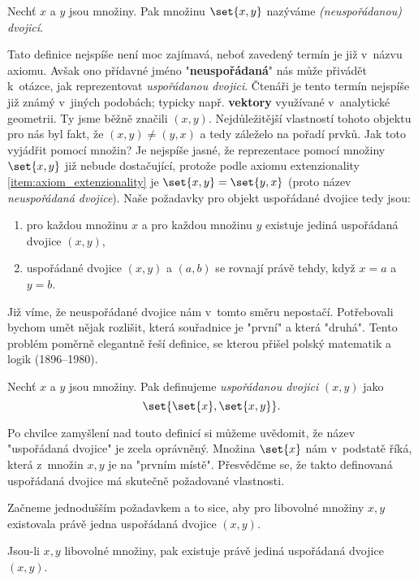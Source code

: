 \begin{definition}
    Nechť $x$ a $y$ jsou množiny. Pak množinu $\set{x,y}$ nazýváme \emph{(neuspořádanou) dvojicí}.
\end{definition}
Tato definice nejspíše není moc zajímavá, neboť zavedený termín je již v~názvu axiomu. Avšak ono přídavné jméno "\textbf{neuspořádaná}" nás může přivádět k~otázce, jak reprezentovat \emph{uspořádanou dvojici}. Čtenáři je tento termín nejspíše již známý v~jiných podobách; typicky např. \textbf{vektory} využívané v~analytické geometrii. Ty jsme běžně značili $(x,y)$. Nejdůležitější vlastností tohoto objektu pro nás byl fakt, že $(x,y)\neq (y,x)$ a tedy záleželo na pořadí prvků. Jak toto vyjádřit pomocí množin? Je nejspíše jasné, že reprezentace pomocí množiny $\set{x,y}$ již nebude dostačující, protože podle axiomu extenzionality \ref{item:axiom_extenzionality} je $\set{x,y}=\set{y,x}$ (proto název \emph{neuspořádaná dvojice}). Naše požadavky pro objekt uspořádané dvojice tedy jsou:
\begin{enumerate}
    \item pro každou množinu $x$ a pro každou množinu $y$ existuje jediná uspořádaná dvojice $(x,y)$,
    \item uspořádané dvojice $(x,y)$ a $(a,b)$ se rovnají právě tehdy, když $x=a$ a $y=b$.
\end{enumerate}
Již víme, že neuspořádané dvojice nám v~tomto směru nepostačí. Potřebovali bychom umět nějak rozlišit, která souřadnice je "první" a která "druhá". Tento problém poměrně elegantně řeší definice, se kterou přišel polský matematik a logik  (1896--1980).
\begin{definition}\label{def:usporadana_dvojice}
    Nechť $x$ a $y$ jsou množiny. Pak definujeme \emph{uspořádanou dvojici} $(x,y)$ jako
    \begin{equation*}
        \set{\set{x},\set{x,y}}.
    \end{equation*}
\end{definition}
Po chvilce zamyšlení nad touto definicí si můžeme uvědomit, že název "uspořádaná dvojice" je zcela oprávněný. Množina $\set{x}$ nám v~podstatě  říká, která z~množin $x,y$ je na "prvním místě". Přesvědčme se, že takto definovaná uspořádaná dvojice má skutečně požadované vlastnosti.\par
Začneme jednodušším požadavkem a to sice, aby pro libovolné množiny $x,y$ existovala právě jedna uspořádaná dvojice $(x,y)$.
\begin{lemma}
    Jsou-li $x,y$ libovolné množiny, pak existuje právě jediná uspořádaná dvojice $(x,y)$.
\end{lemma}

